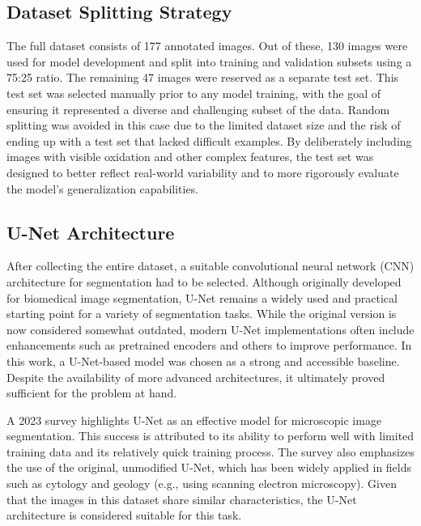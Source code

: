 \subsection{Dataset Splitting Strategy}\label{sec:data_split}
The full dataset consists of 177 annotated images. Out of these, 130 images were used for model development and split into training and validation subsets using a 75:25 ratio. The remaining 47 images were reserved as a separate test set. This test set was selected manually prior to any model training, with the goal of ensuring it represented a diverse and challenging subset of the data. Random splitting was avoided in this case due to the limited dataset size and the risk of ending up with a test set that lacked difficult examples. By deliberately including images with visible oxidation and other complex features, the test set was designed to better reflect real-world variability and to more rigorously evaluate the model's generalization capabilities.


\subsection{U-Net Architecture}
After collecting the entire dataset, a suitable convolutional neural network (CNN) architecture for segmentation had to be selected. Although originally developed for biomedical image segmentation, U-Net \cite{ronneberger2015unetconvolutionalnetworksbiomedical} remains a widely used and practical starting point for a variety of segmentation tasks. While the original version is now considered somewhat outdated, modern U-Net implementations often include enhancements such as pretrained encoders and others to improve performance. In this work, a U-Net-based model was chosen as a strong and accessible baseline. Despite the availability of more advanced architectures, it ultimately proved sufficient for the problem at hand. 

A 2023 survey \cite{wu_state---art_2024} highlights U-Net as an effective model for microscopic image segmentation. This success is attributed to its ability to perform well with limited training data and its relatively quick training process. The survey also emphasizes the use of the original, unmodified U-Net, which has been widely applied in fields such as cytology and geology \cite{chen_deep_2020} (e.g., using scanning electron microscopy). Given that the images in this dataset share similar characteristics, the U-Net architecture is considered suitable for this task.


